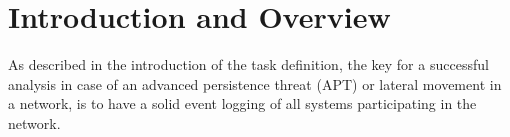 \section{Introduction and Overview}
As described in the introduction of the task definition, the key for a successful analysis in case of an advanced persistence threat (APT) or lateral movement in a network, is to have a solid event logging of all systems participating in the network.

